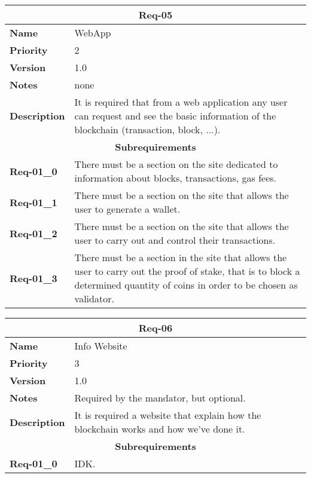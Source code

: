 \documentclass[../documentation.tex]{subfiles}
\begin{document}
\bgroup{}
\def\arraystretch{1.25}
\begin{center}
    \begin{tabular}{ |l|p{9cm}| }
        \hline
        \multicolumn{2}{|c|}{\textbf{Req-05}} \\
        \hline
        \textbf{Name} & WebApp \\
        \hline
        \textbf{Priority} & 2 \\
        \hline
        \textbf{Version} & 1.0 \\
        \hline
        \textbf{Notes} & none \\
        \hline
        \textbf{Description} & It is required that from a web application any user can request and see the basic information of the blockchain (transaction, block, ...). \\
        \hline
        \multicolumn{2}{|c|}{\textbf{Subrequirements}} \\
        \hline
        \textbf{Req-01\_0} & There must be a section on the site dedicated to information about blocks, transactions, gas fees. \\
        \hline
        \textbf{Req-01\_1} & There must be a section on the site that allows the user to generate a wallet. \\
        \hline
        \textbf{Req-01\_2} & There must be a section on the site that allows the user to carry out and control their transactions. \\
        \hline
        \textbf{Req-01\_3} & There must be a section in the site that allows the user to carry out the proof of stake, that is to block a determined quantity of coins in order to be chosen as validator. \\
        \hline
    \end{tabular}
\end{center}
\egroup{}

\bgroup{}
\def\arraystretch{1.25}
\begin{center}
    \begin{tabular}{ |l|p{9cm}| }
        \hline
        \multicolumn{2}{|c|}{\textbf{Req-06}} \\
        \hline
        \textbf{Name} & Info Website \\
        \hline
        \textbf{Priority} & 3 \\
        \hline
        \textbf{Version} & 1.0 \\
        \hline
        \textbf{Notes} & Required by the mandator, but optional. \\
        \hline
        \textbf{Description} & It is required a website that explain how the blockchain works and how we've done it. \\
        \hline
        \multicolumn{2}{|c|}{\textbf{Subrequirements}} \\
        \hline
        \textbf{Req-01\_0} & IDK. \\
        \hline
    \end{tabular}
\end{center}
\egroup{}
\end{document}
